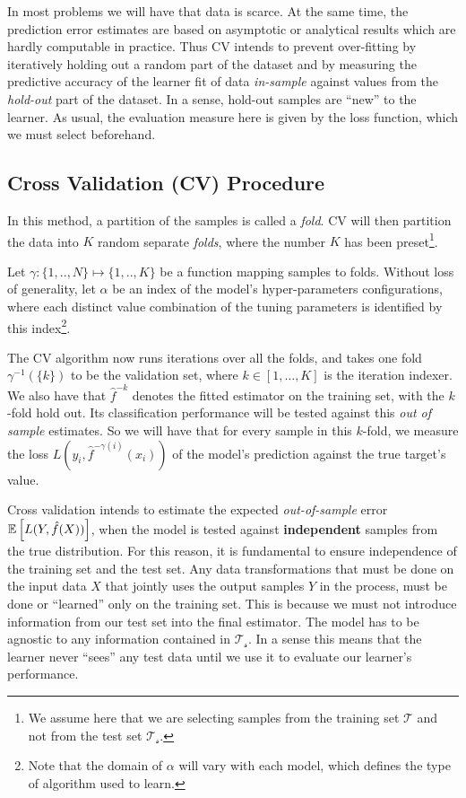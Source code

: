In most problems we will have that data is scarce.
At the same time, the prediction error estimates are based on asymptotic or analytical results which are hardly computable in practice. 
Thus CV intends to prevent over-fitting by iteratively holding out a random part of the dataset and by measuring the predictive accuracy of the learner fit of data \textit{in-sample} against values from the \textit{hold-out} part of the dataset. 
In a sense, hold-out samples are ``new'' to the learner. 
As usual, the evaluation measure here is given by the loss function, which we must select beforehand.

\subsection{Cross Validation (CV) Procedure}\label{subsection:crossValidationProcedure}

In this method, a partition of the samples is called a \textit{fold}.
CV will then partition the data into $K$ random separate \textit{folds}, where the number $K$ has been preset\footnote{ We assume here that we are selecting samples from the training set $\mathcal{T}$ and not from the test set $\mathcal{T_s}$.}. 

Let $\gamma : \{1,..,N\} \mapsto \{1, .., K\}$ be a function mapping samples to folds.
Without loss of generality, let $\alpha$ be an index of the model's hyper-parameters configurations, where each distinct value combination of the tuning parameters is identified by this index\footnote{ Note that the domain of $\alpha$ will vary with each model, which defines the type of algorithm used to learn.}. 

The CV algorithm now runs iterations over all the folds, and takes one fold $\gamma^{-1}(\{k\})$ to be the validation set, where $k \in [1,\ldots,K]$ is the iteration indexer. 
We also have that $\hat{f}^{-k}$ denotes the fitted estimator on the training set, with the $k$-fold hold out. 
Its classification performance will be tested against this \textit{out of sample} estimates. 
So we will have that for every sample in this $k$-fold, we measure the loss $L(y_i, \hat{f}^{-\gamma(i)}(x_i))$ of the model's prediction against the true target's value. 

Cross validation intends to estimate the expected \textit{out-of-sample} error $\operatorname{\mathbb{E}} \left[ L(Y, \hat{f}(X)) \right]$, when the model is tested against \textbf{independent} samples from the true distribution.
For this reason, it is fundamental to ensure independence of the training set and the test set.
Any data transformations that must be done on the input data $X$ that jointly uses the output samples $Y$ in the process, must be done or ``learned'' only on the training set. 
This is because we must not introduce information from our test set into the final estimator. 
The model has to be agnostic to any information contained in $\mathcal{T_s}$.
In a sense this means that the learner never ``sees'' any test data until we use it to evaluate our learner's performance.

